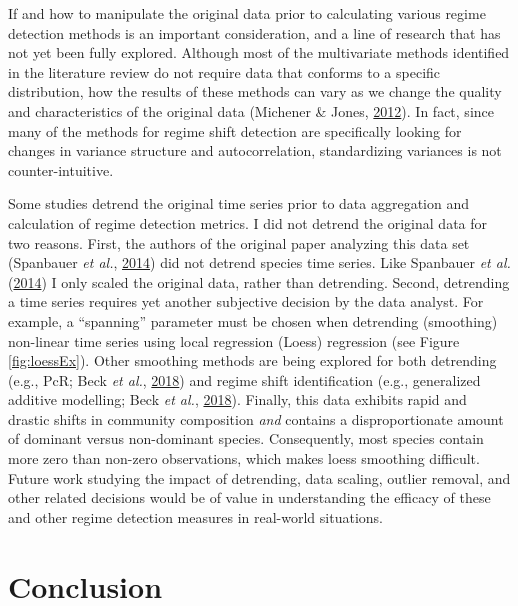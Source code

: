 \documentclass[print]{nuthesis}
\begin{document}
If and how to manipulate the original data prior to calculating various regime detection methods is an important consideration, and a line of research that has not yet been fully explored. Although most of the multivariate methods identified in the literature review do not require data that conforms to a specific distribution, how the results of these methods can vary as we change the quality and characteristics of the original data (Michener \& Jones, \protect\hyperlink{ref-michener2012ecoinformatics}{2012}). In fact, since many of the methods for regime shift detection are specifically looking for changes in variance structure and autocorrelation, standardizing variances is not counter-intuitive.

Some studies detrend the original time series prior to data aggregation and calculation of regime detection metrics. I did not detrend the original data for two reasons. First, the authors of the original paper analyzing this data set (Spanbauer \emph{et al.}, \protect\hyperlink{ref-spanbauer_prolonged_2014}{2014}) did not detrend species time series. Like Spanbauer \emph{et al.} (\protect\hyperlink{ref-spanbauer_prolonged_2014}{2014}) I only scaled the original data, rather than detrending. Second, detrending a time series requires yet another subjective decision by the data analyst. For example, a ``spanning'' parameter must be chosen when detrending (smoothing) non-linear time series using local regression (Loess) regression (see Figure \ref{fig:loessEx}). Other smoothing methods are being explored for both detrending (e.g., PcR; Beck \emph{et al.}, \protect\hyperlink{ref-beck_variance_2018}{2018}) and regime shift identification (e.g., generalized additive modelling; Beck \emph{et al.}, \protect\hyperlink{ref-beck_variance_2018}{2018}). Finally, this data exhibits rapid and drastic shifts in community composition \emph{and} contains a disproportionate amount of dominant versus non-dominant species. Consequently, most species contain more zero than non-zero observations, which makes loess smoothing difficult. Future work studying the impact of detrending, data scaling, outlier removal, and other related decisions would be of value in understanding the efficacy of these and other regime detection measures in real-world situations.

\hypertarget{conclusion}{%
\section{Conclusion}\label{conclusion}}
\end{document}
